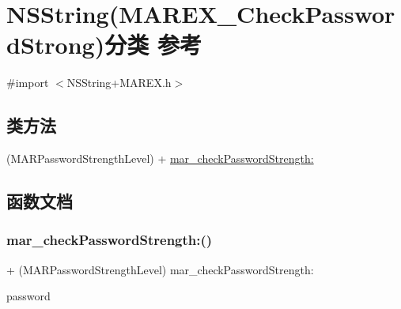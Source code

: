 \hypertarget{category_n_s_string_07_m_a_r_e_x___check_password_strong_08}{}\section{N\+S\+String(M\+A\+R\+E\+X\+\_\+\+Check\+Password\+Strong)分类 参考}
\label{category_n_s_string_07_m_a_r_e_x___check_password_strong_08}


{\ttfamily \#import $<$N\+S\+String+\+M\+A\+R\+E\+X.\+h$>$}

\subsection*{类方法}
\begin{DoxyCompactItemize}
\item 
(M\+A\+R\+Password\+Strength\+Level) + \hyperlink{category_n_s_string_07_m_a_r_e_x___check_password_strong_08_ad08640cc7afc2a3299b79f9c41fe2563}{mar\+\_\+check\+Password\+Strength\+:}
\end{DoxyCompactItemize}


\subsection{函数文档}
\mbox{\label{category_n_s_string_07_m_a_r_e_x___check_password_strong_08_ad08640cc7afc2a3299b79f9c41fe2563}} 
\subsubsection{\texorpdfstring{mar\+\_\+check\+Password\+Strength\+:()}{mar\_checkPasswordStrength:()}}
{\footnotesize\ttfamily + (M\+A\+R\+Password\+Strength\+Level) mar\+\_\+check\+Password\+Strength\+: \begin{DoxyParamCaption}\item[{(N\+S\+String $\ast$\+\_\+\+Nonnull)}]{password }\end{DoxyParamCaption}}

